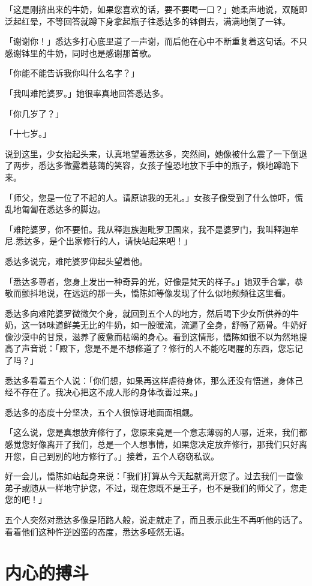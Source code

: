\documentclass[12pt,twoside,openany]{book}
\begin{document}
「这是刚挤出来的牛奶，如果您喜欢的话，要不要喝一口？」她柔声地说，双随即泛起红晕，不等回答就蹲下身拿起瓶子往悉达多的钵倒去，满满地倒了一钵。

「谢谢你！」悉达多打心底里道了一声谢，而后他在心中不断重复着这句话。不只感谢钵里的牛奶，同时也是感谢那首歌。

「你能不能告诉我你叫什么名字？」

「我叫难陀婆罗。」她很率真地回答悉达多。

「你几岁了？」

「十七岁。」

说到这里，少女抬起头来，认真地望着悉达多，突然间，她像被什么震了一下倒退了两步，悉达多微露着慈蔼的笑容，女孩子惶恐地放下手中的瓶子，倏地蹲跪下来。

「师父，您是一位了不起的人。请原谅我的无礼。」女孩子像受到了什么惊吓，慌乱地匍匐在悉达多的脚边。

「难陀婆罗，你不要怕。我从释迦族迦毗罗卫国来，我不是婆罗门，我叫释迦牟尼.悉达多，是个出家修行的人，请快站起来吧！」

悉达多说完，难陀婆罗仰起头望着他。

「悉达多尊者，您身上发出一种奇异的光，好像是梵天的样子。」她双手合掌，恭敬而颤抖地说，在远远的那一头，憍陈如等像发现了什么似地频频往这里看。

悉达多向难陀婆罗微微欠个身，就回到五个人的地方，然后喝下少女所供养的牛奶，这一钵味道鲜美无比的牛奶，如一股暖流，流遍了全身，舒畅了筋骨。牛奶好像沙漠中的甘泉，滋养了疲惫而枯竭的身心。看到这情形，憍陈如很不以为然地提高了声音说：「殿下，您是不是不想修道了？修行的人不能吃喝腥的东西，您忘记了吗？」

悉达多看着五个人说：「你们想，如果再这样虐待身体，那么还没有悟道，身体己经不存在了。我决心把这不成人形的身体改善过来。」

悉达多的态度十分坚决，五个人很惊讶地面面相觑。

「这么说，您是真想放弃修行了，您原来竟是一个意志薄弱的人哪，近来，我们都感觉您好像离开了我们，总是一个人想事情，如果您决定放弃修行，那我们只好离开您，自己到别的地方修行了。」接着，五个人窃窃私议。

好一会儿，憍陈如站起身来说：「我们打算从今天起就离开您了。过去我们一直像弟子或随从一样地守护您，不过，现在您既不是王子，也不是我们的师父了，您走您的吧！」

五个人突然对悉达多像是陌路人般，说走就走了，而且表示此生不再听他的话了。看着他们这种忤逆凶蛮的态度，悉达多哑然无语。

\section{内心的搏斗}\label{sec1.10}
\end{document}
